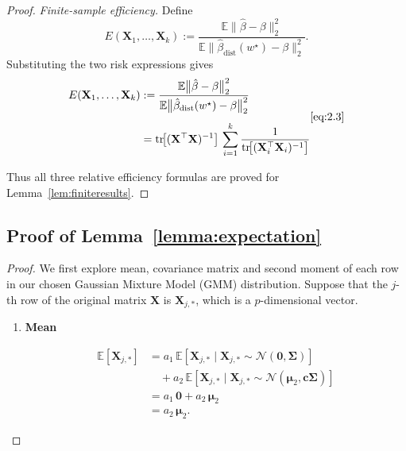 \documentclass[11pt]{article}
\numberwithin{equation}{section}
\theoremstyle{plain}
\theoremstyle{definition}
\theoremstyle{remark}
\begin{document}
\begin{appendix}
\begin{proof}
      \medskip
      \textit{Finite-sample efficiency.}
      Define
      \[
        E(\mathbf{X}_{1},\dots,\mathbf{X}_{k})
         :=\frac{\mathbb E\bigl\|\hat\beta-\beta\bigr\|_{2}^{2}}
             {\mathbb E\bigl\|\hat\beta_{\mathrm{dist}}(w^{\star})-\beta\bigr\|_{2}^{2}} .
      \]
      Substituting the two risk expressions gives
      \[
      \begin{aligned}
        E(\mathbf{X}_{1},\dots,\mathbf{X}_{k})
         &:=\frac{\mathbb E\bigl\|\hat\beta-\beta\bigr\|_{2}^{2}}
             {\mathbb E\bigl\|\hat\beta_{\mathrm{dist}}(w^{\star})-\beta\bigr\|_{2}^{2}}
             \\[4pt]
         &=\operatorname{tr}\!\bigl[(\mathbf{X}^{\top}\mathbf{X})^{-1}\bigr]\,
           \sum_{i=1}^{k}
           \frac{1}{\operatorname{tr}\!\bigl[(\mathbf{X}_i^{\top}\mathbf{X}_i)^{-1}\bigr]}
      \end{aligned}
      \ref{eq:2.3}
      \]

      Thus all three relative efficiency formulas are proved for Lemma~\ref{lem:finiteresults}.

      \end{proof}

      \subsection{Proof of Lemma~\ref{lemma:expectation}}
      \begin{proof}
      We first explore mean, covariance matrix and second moment of each row in our chosen Gaussian Mixture Model (GMM) distribution.
      Suppose that the $j$-th row of the original matrix $\mathbf{X}$ is $\mathbf{X}_{j,\ast}$, which is a $p$-dimensional vector.

      \begin{enumerate}
         \item \textbf{Mean}

        \begin{align*}
         \mathbb E[\mathbf{X}_{j,\ast}]
         &= a_{1}\,\mathbb E[\mathbf{X}_{j,\ast}\mid\mathbf{X}_{j,\ast}\sim\mathcal N(\boldsymbol 0,\mathbf{\Sigma})] \\
         &\quad + a_{2}\,\mathbb E[\mathbf{X}_{j,\ast}\mid\mathbf{X}_{j,\ast}\sim\mathcal N(\boldsymbol\mu_{2},\boldsymbol c\mathbf{\Sigma})] \\[2pt]
         &= a_{1}\,\boldsymbol 0 + a_{2}\,\boldsymbol\mu_{2} \\[2pt]
         &= a_{2}\,\boldsymbol\mu_{2}.
        \end{align*}


\end{enumerate}
\end{proof}
\end{appendix}
\end{document}
